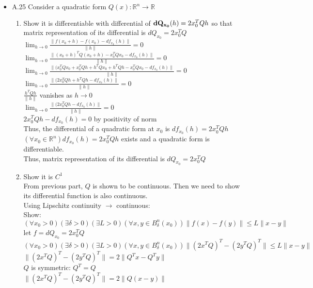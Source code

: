 \documentclass[12pt,letter]{article}
\newcommand{\R}{\mathbb{R}}
\begin{document}
\begin{itemize}
\item A.25
  Consider a quadratic form $Q(x): \R^n\rightarrow\R$\\
  \begin{enumerate}
  \item
    Show it is differentiable with differential of $\bold{dQ_{x_0}}(h)=2x_0^TQh$ so that matrix representation of its differential is $dQ_{x_0}=2x_0^TQ$\\
    $\lim_{h \to 0} \frac{\|f(x_0+h)-f(x_0)-df_{x_0}(h)\|}{\|h\|}=0$\\
    $\lim_{h \to 0} \frac{\|(x_0+h)^TQ(x_0+h)-x_0^TQx_0-df_{x_0}(h)\|}{\|h\|}=0$\\
    $\lim_{h \to 0} \frac{\|(x_0^TQx_0+x_0^TQh+h^TQx_0+h^TQh-x_0^TQx_0-df_{x_0}(h)\|}{\|h\|}=0$\\
    $\lim_{h \to 0} \frac{\|(2x_0^TQh+h^TQh-df_{x_0}(h)\|}{\|h\|}=0$\\
    $\frac{h^TQh}{\|h\|}$ vanishes as $h \to 0$\\
    $\lim_{h \to 0} \frac{\|(2x_0^TQh-df_{x_0}(h)\|}{\|h\|}=0$\\
    $2x_0^TQh-df_{x_0}(h)=0$ by positivity of norm\\
    Thus, the differential of a quadratic form at $x_0$ is $df_{x_0}(h)=2x_0^TQh$\\
    $(\forall x_0 \in \R^n)df_{x_0}(h)=2x_0^TQh$ exists and a quadratic form is differentiable.\\
    Thus, matrix representation of its differential is $dQ_{x_0}=2x_0^TQ$
  \item
    Show it is $C^1$\\
    From previous part, $Q$ is shown to be continuous. Then we need to show its differential function is also continuous.\\
    Using Lipschitz continuity $\rightarrow$ continuous:\\
    Show:\\
    $(\forall x_0>0)(\exists \delta>0)(\exists L>0)(\forall x,y \in B_{\delta}^n(x_0)) \|f(x)-f(y) \| \leq L \|x-y\|$\\
    let $f=dQ_{x_0}=2x_0^TQ$\\
    $(\forall x_0>0)(\exists \delta>0)(\exists L>0)(\forall x,y \in B_{\delta}^n(x_0)) \|(2x^TQ)^T-(2y^TQ)^T \| \leq L \|x-y\|$\\
    $\|(2x^TQ)^T-(2y^TQ)^T\|=2\|Q^Tx-Q^Ty\|$\\
    $Q$ is symmetric: $Q^T=Q$\\
    $\|(2x^TQ)^T-(2y^TQ)^T\|=2\|Q(x-y)\|$\\

\end{enumerate}
\end{itemize}
\end{document}
